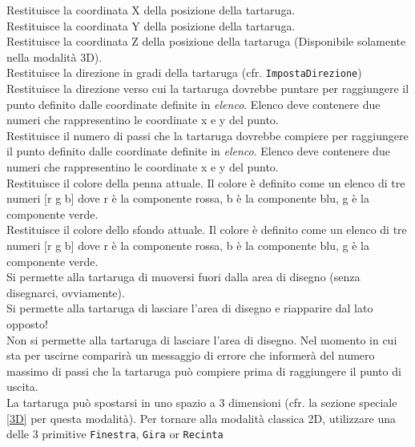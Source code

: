  Restituisce la coordinata X della posizione della tartaruga.\\

 Restituisce la coordinata Y della posizione della tartaruga.\\

 Restituisce la coordinata Z della posizione della tartaruga (Disponibile solamente nella modalità 3D).\\

 Restituisce la direzione in gradi della tartaruga (cfr. \texttt{ImpostaDirezione})  \\
 Restituisce la direzione verso cui la tartaruga dovrebbe puntare per raggiungere il punto definito dalle coordinate definite in \textit{elenco}. Elenco deve contenere due numeri che rappresentino le coordinate x e y del punto.\\
Restituisce il numero di passi che la tartaruga dovrebbe compiere per raggiungere il punto definito dalle coordinate definite in \textit{elenco}. Elenco deve contenere due numeri che rappresentino le coordinate x e y del punto.\\
 Restituisce il colore della penna attuale. Il colore è definito come un elenco di tre numeri [r g b] dove r è la componente rossa, b è la componente blu, g è la componente verde.  \\
 Restituisce il colore dello sfondo attuale. Il colore è definito come un elenco di tre numeri [r g b] dove r è la componente rossa, b è la componente blu, g è la componente verde.  \\
 Si permette alla tartaruga di muoversi fuori dalla area di disegno (senza disegnarci, ovviamente).\\
 Si permette alla tartaruga di lasciare l'area di disegno e riapparire dal lato opposto!\\
 Non si permette alla tartaruga di lasciare l'area di disegno. Nel momento in cui sta per uscirne comparirà un messaggio di errore che informerà del numero massimo di passi che la tartaruga può compiere prima di raggiungere il punto di uscita.\\
 La tartaruga può spostarsi in uno spazio a 3 dimensioni (cfr. la sezione speciale \ref{3D} per questa modalità). Per tornare alla modalità classica 2D, utilizzare una delle 3 primitive \texttt{Finestra}, \texttt{Gira} or \texttt{Recinta}\\
